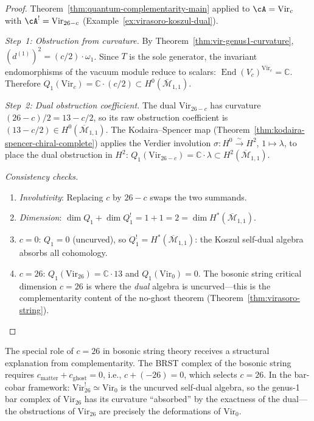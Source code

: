 \begin{proof}
Theorem~\ref{thm:quantum-complementarity-main} applied to
$\cA = \mathrm{Vir}_c$ with $\cA^! = \mathrm{Vir}_{26-c}$
(Example~\ref{ex:virasoro-koszul-dual}).

\emph{Step~1: Obstruction from curvature.}
By Theorem~\ref{thm:vir-genus1-curvature},
$(d^{(1)})^2 = (c/2) \cdot \omega_1$.  Since $T$ is the sole generator,
the invariant endomorphisms of the vacuum module reduce to scalars:
$\operatorname{End}(V_c)^{\mathrm{Vir}_c} = \mathbb{C}$.
Therefore $Q_1(\mathrm{Vir}_c) = \mathbb{C} \cdot (c/2) \subset
H^0(\overline{\mathcal{M}}_{1,1})$.

\emph{Step~2: Dual obstruction coefficient.}
The dual $\mathrm{Vir}_{26-c}$ has curvature $(26-c)/2 = 13 - c/2$, so
its raw obstruction coefficient is $(13 - c/2) \in H^0(\overline{\mathcal{M}}_{1,1})$.
The Kodaira--Spencer map (Theorem~\ref{thm:kodaira-spencer-chiral-complete})
applies the Verdier involution $\sigma\colon H^0 \xrightarrow{\sim} H^2$,
$1 \mapsto \lambda$, to place the dual obstruction in $H^2$:
$Q_1(\mathrm{Vir}_{26-c}) = \mathbb{C} \cdot \lambda \subset
H^2(\overline{\mathcal{M}}_{1,1})$.

\emph{Consistency checks.}
\begin{enumerate}
\item \emph{Involutivity}: Replacing $c$ by $26-c$ swaps the two
  summands. \checkmark
\item \emph{Dimension}: $\dim Q_1 + \dim Q_1^! = 1 + 1 = 2 =
  \dim H^*(\overline{\mathcal{M}}_{1,1})$. \checkmark
\item \emph{$c = 0$}: $Q_1 = 0$ (uncurved), so $Q_1^! =
  H^*(\overline{\mathcal{M}}_{1,1})$: the Koszul self-dual algebra absorbs
  all cohomology. \checkmark
\item \emph{$c = 26$}: $Q_1(\mathrm{Vir}_{26}) = \mathbb{C} \cdot 13$
  and $Q_1(\mathrm{Vir}_0) = 0$.  The bosonic string critical dimension
  $c = 26$ is where the \emph{dual} algebra is uncurved---this is the
  complementarity content of the no-ghost theorem
  (Theorem~\ref{thm:virasoro-string}). \checkmark
\end{enumerate}
\end{proof}

\begin{remark}\label{rem:vir-bosonic-string}
The special role of $c = 26$ in bosonic string theory receives a
structural explanation from complementarity.  The BRST complex of the
bosonic string requires $c_{\mathrm{matter}} + c_{\mathrm{ghost}} = 0$,
i.e., $c + (-26) = 0$, which selects $c = 26$.  In the bar-cobar framework:
$\mathrm{Vir}_{26}^! \simeq \mathrm{Vir}_0$ is the uncurved self-dual
algebra, so the genus-1 bar complex of $\mathrm{Vir}_{26}$ has its
curvature ``absorbed'' by the exactness of the dual---the obstructions
of $\mathrm{Vir}_{26}$ are precisely the deformations of $\mathrm{Vir}_0$.
\end{remark}


